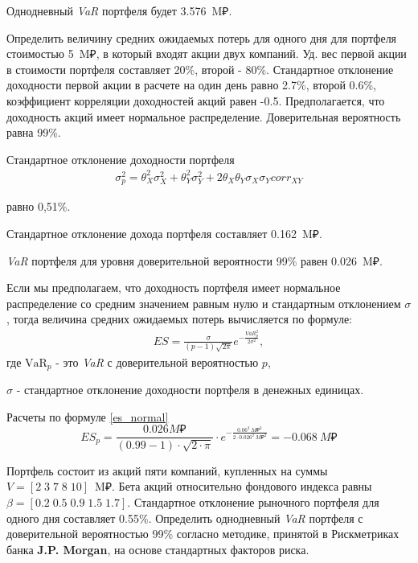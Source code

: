 \documentclass[12pt, table, twoside, a4paper]{exam}
\begin{document}
\begin{questions}
\begin{solution}[6em]
	Однодневный \textit{VaR} портфеля будет 3.576~M₽.
\end{solution}

\pagebreak
\question[10] Определить величину средних ожидаемых потерь для одного дня для портфеля стоимостью 5~M₽, в который входят акции двух компаний. Уд. вес первой акции в стоимости портфеля составляет 20\%, второй - 80\%. Стандартное отклонение доходности первой акции в расчете на один день равно 2.7\%, второй 0.6\%, коэффициент корреляции доходностей акций равен -0.5. Предполагается, что доходность акций имеет нормальное распределение. Доверительная вероятность равна 99\%.

\begin{solution}[12em]
	
	\raggedright
	Стандартное отклонение доходности портфеля 
	\begin{align}
	\label{riskXYcorr}
	\sigma_p^2=\theta_X^2\sigma_X^2+\theta_Y^2\sigma_Y^2+2\theta_X\theta_Y\sigma_X\sigma_Y corr_{XY}
	\end{align}
	
	равно 0,51\%.
	
	Стандартное отклонение дохода портфеля составляет 0.162~M₽.
	
	\textit{VaR} портфеля для уровня доверительной вероятности 99\% равен 0.026~M₽.
	
	Если мы предполагаем, что доходность портфеля имеет нормальное распределение со средним значением равным нулю и стандартным отклонением $\sigma$, тогда величина средних ожидаемых потерь вычисляется по формуле:
	\begin{align}
	\label{es_normal}
	ES=\frac{\sigma}{(p-1)\sqrt{2\pi}}e^{-\frac{VaR_{p}^2}{2\sigma^2}},
	\end{align}
	где 
	$\mbox{VaR}_{p}$ - это \textit{VaR} с доверительной вероятностью $p$,
	
	$\sigma$ - стандартное отклонение доходности портфеля в денежных единицах.
	
	Расчеты по формуле \eqref{es_normal} 
	$$ES_{p}=\frac{0.026M₽}{(0.99-1)\cdot \sqrt{2 \cdot \pi}}\cdot e^{-\frac{0.06^2~M₽^2}{2 \cdot 0.026^2~M₽^2}}=-0.068~M₽$$
\end{solution}

\question[10] Портфель состоит из акций пяти компаний, купленных на суммы   $V=[2\;3\;7\;8\;10]$~M₽. Бета акций относительно фондового индекса равны $\beta=[0.2\;0.5\;0.9\;1.5\;1.7]$. Стандартное отклонение рыночного портфеля для одного дня составляет 0.55\%. Определить однодневный  \textit{VaR }портфеля с доверительной вероятностью 99\% согласно методике, принятой в Рискметриках банка \textbf{J.P. Morgan}, на основе стандартных факторов риска. 


\end{questions}
\end{document}
